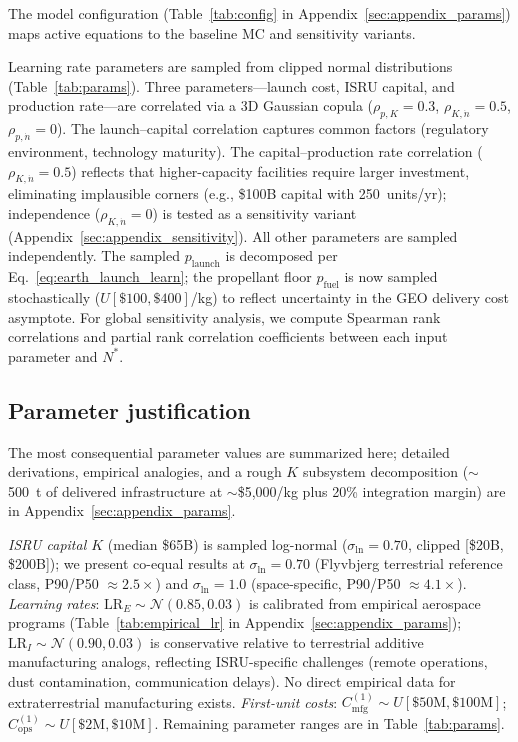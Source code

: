\documentclass[preprint,12pt]{elsarticle}
\begin{document}
The model configuration (Table~\ref{tab:config} in Appendix~\ref{sec:appendix_params}) maps active equations to the baseline MC and sensitivity variants.

Learning rate parameters are sampled from clipped normal distributions (Table~\ref{tab:params}). Three parameters---launch cost, ISRU capital, and production rate---are correlated via a 3D Gaussian copula ($\rho_{p,K} = 0.3$, $\rho_{K,\dot{n}} = 0.5$, $\rho_{p,\dot{n}} = 0$). The launch--capital correlation captures common factors (regulatory environment, technology maturity). The capital--production rate correlation ($\rho_{K,\dot{n}} = 0.5$) reflects that higher-capacity facilities require larger investment, eliminating implausible corners (e.g., \$100B capital with 250~units/yr); independence ($\rho_{K,\dot{n}} = 0$) is tested as a sensitivity variant (Appendix~\ref{sec:appendix_sensitivity}). All other parameters are sampled independently. The sampled $p_{\mathrm{launch}}$ is decomposed per Eq.~\ref{eq:earth_launch_learn}; the propellant floor $p_{\mathrm{fuel}}$ is now sampled stochastically ($U[\$100, \$400]$/kg) to reflect uncertainty in the GEO delivery cost asymptote. For global sensitivity analysis, we compute Spearman rank correlations and partial rank correlation coefficients between each input parameter and $N^*$.

\subsection{Parameter justification}
\label{sec:param_justification}

The most consequential parameter values are summarized here; detailed derivations, empirical analogies, and a rough $K$ subsystem decomposition (${\sim}$500~t of delivered infrastructure at ${\sim}$\$5{,}000/kg plus 20\% integration margin) are in Appendix~\ref{sec:appendix_params}.

\emph{ISRU capital $K$} (median \$65B) is sampled log-normal ($\sigma_{\ln} = 0.70$, clipped [\$20B, \$200B]); we present co-equal results at $\sigma_{\ln} = 0.70$ (Flyvbjerg terrestrial reference class, P90/P50 $\approx 2.5\times$) and $\sigma_{\ln} = 1.0$ (space-specific, P90/P50 $\approx 4.1\times$). \emph{Learning rates}: $\mathrm{LR}_E \sim \mathcal{N}(0.85, 0.03)$ is calibrated from empirical aerospace programs (Table~\ref{tab:empirical_lr} in Appendix~\ref{sec:appendix_params}); $\mathrm{LR}_I \sim \mathcal{N}(0.90, 0.03)$ is conservative relative to terrestrial additive manufacturing analogs, reflecting ISRU-specific challenges (remote operations, dust contamination, communication delays). No direct empirical data for extraterrestrial manufacturing exists. \emph{First-unit costs}: $C_{\mathrm{mfg}}^{(1)} \sim U[\$50\text{M}, \$100\text{M}]$; $C_{\mathrm{ops}}^{(1)} \sim U[\$2\text{M}, \$10\text{M}]$. Remaining parameter ranges are in Table~\ref{tab:params}.
\end{document}
